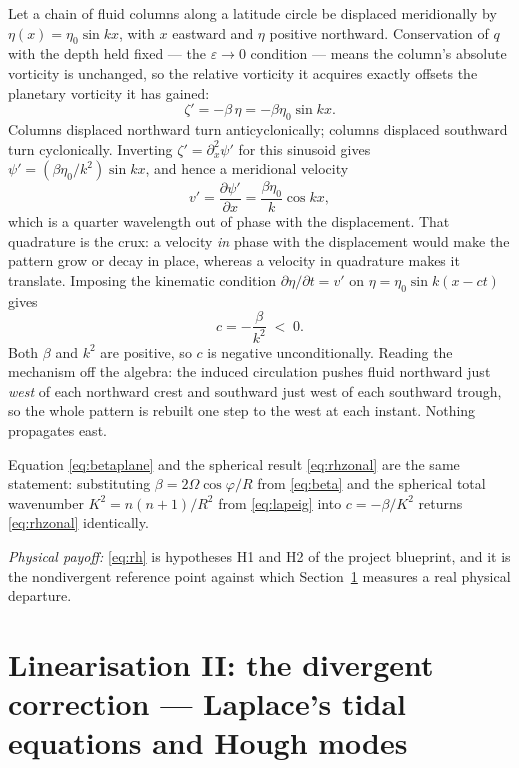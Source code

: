 \documentclass[11pt,a4paper]{article}
\begin{document}
Let a chain of fluid columns along a latitude circle be displaced meridionally by
$\eta(x) = \eta_0\sin kx$, with $x$ eastward and $\eta$ positive northward.
Conservation of $q$ with the depth held fixed --- the $\varepsilon\to0$
condition --- means the column's absolute vorticity is unchanged, so the
relative vorticity it acquires exactly offsets the planetary vorticity it has
gained:
%
\begin{equation}
\zeta' = -\beta\,\eta = -\beta\eta_0\sin kx .
\label{eq:zetaeta}
\end{equation}
%
Columns displaced northward turn anticyclonically; columns displaced southward
turn cyclonically. Inverting $\zeta' = \partial_x^2\psi'$ for this sinusoid gives
$\psi' = (\beta\eta_0/k^2)\sin kx$, and hence a meridional velocity
%
\begin{equation}
v' = \frac{\partial\psi'}{\partial x} = \frac{\beta\eta_0}{k}\cos kx ,
\label{eq:vinduced}
\end{equation}
%
which is a quarter wavelength out of phase with the displacement. That
quadrature is the crux: a velocity \emph{in} phase with the displacement would
make the pattern grow or decay in place, whereas a velocity in quadrature makes
it translate. Imposing the kinematic condition $\partial\eta/\partial t = v'$ on
$\eta = \eta_0\sin k(x - ct)$ gives
%
\begin{equation}
c = -\frac{\beta}{k^2} \;<\; 0 .
\label{eq:betaplane}
\end{equation}
%
Both $\beta$ and $k^2$ are positive, so $c$ is negative unconditionally. Reading
the mechanism off the algebra: the induced circulation pushes fluid northward
just \emph{west} of each northward crest and southward just west of each
southward trough, so the whole pattern is rebuilt one step to the west at each
instant. Nothing propagates east.

Equation \eqref{eq:betaplane} and the spherical result \eqref{eq:rhzonal} are the
same statement: substituting $\beta = 2\Omega\cos\varphi/R$ from \eqref{eq:beta}
and the spherical total wavenumber $K^2 = n(n+1)/R^2$ from \eqref{eq:lapeig}
into $c = -\beta/K^2$ returns \eqref{eq:rhzonal} identically.

\medskip
\noindent\emph{Physical payoff:} \eqref{eq:rh} is hypotheses H1 and H2 of the
project blueprint, and it is the nondivergent reference point against which
Section~\ref{sec:hough} measures a real physical departure.

\section{Linearisation II: the divergent correction --- Laplace's tidal
equations and Hough modes}
\label{sec:hough}
\end{document}
